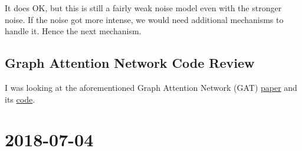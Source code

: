 \documentclass[a4paper]{article}
\newcommand{\DatestampYMD}[3]{\mbox{#1-#2-#3}}
\newcommand{\entry}[3]{\newpage\section*{\DatestampYMD{#1}{#2}{#3}} }
\begin{document}
\begin{figure}[H]
\begin{minipage}{.45\linewidth}
    \end{minipage}
    \begin{minipage}{.9\linewidth}
        \centering
    \end{minipage}
    \centering
    \label{fig:pairwise3inf_large_plot}
\end{figure}
It does OK, but this is still a fairly weak noise model even with the stronger noise.
If the noise got more intense, we would need additional mechanisms to handle it.
Hence the next mechanism.

\subsection*{Graph Attention Network Code Review}
I was looking at the aforementioned Graph Attention Network (GAT) \href{https://arxiv.org/pdf/1710.10903.pdf}{paper} and its \href{https://github.com/PetarV-/GAT}{code}.

\entry{2018}{07}{04}
\end{document}
